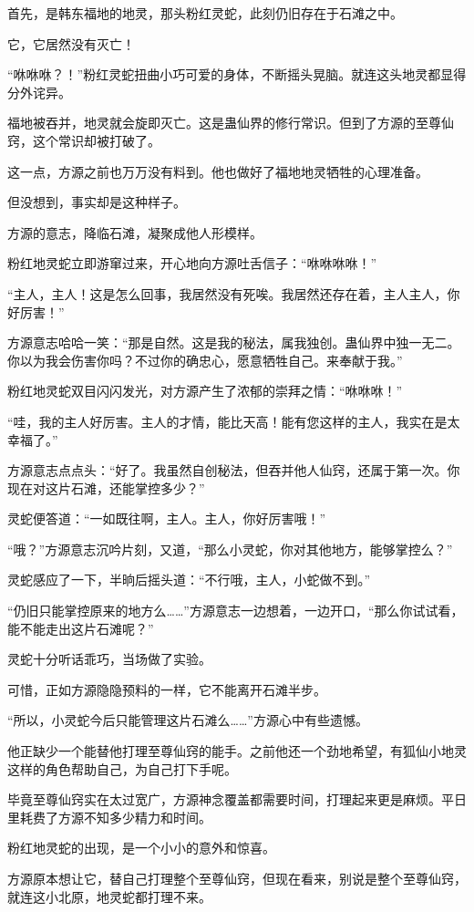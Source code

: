 \begin{this_body}
首先，是韩东福地的地灵，那头粉红灵蛇，此刻仍旧存在于石滩之中。

它，它居然没有灭亡！

“咻咻咻？！”粉红灵蛇扭曲小巧可爱的身体，不断摇头晃脑。就连这头地灵都显得分外诧异。

福地被吞并，地灵就会旋即灭亡。这是蛊仙界的修行常识。但到了方源的至尊仙窍，这个常识却被打破了。

这一点，方源之前也万万没有料到。他也做好了福地地灵牺牲的心理准备。

但没想到，事实却是这种样子。

方源的意志，降临石滩，凝聚成他人形模样。

粉红地灵蛇立即游窜过来，开心地向方源吐舌信子：“咻咻咻咻！”

“主人，主人！这是怎么回事，我居然没有死唉。我居然还存在着，主人主人，你好厉害！”

方源意志哈哈一笑：“那是自然。这是我的秘法，属我独创。蛊仙界中独一无二。你以为我会伤害你吗？不过你的确忠心，愿意牺牲自己。来奉献于我。”

粉红地灵蛇双目闪闪发光，对方源产生了浓郁的崇拜之情：“咻咻咻！”

“哇，我的主人好厉害。主人的才情，能比天高！能有您这样的主人，我实在是太幸福了。”

方源意志点点头：“好了。我虽然自创秘法，但吞并他人仙窍，还属于第一次。你现在对这片石滩，还能掌控多少？”

灵蛇便答道：“一如既往啊，主人。主人，你好厉害哦！”

“哦？”方源意志沉吟片刻，又道，“那么小灵蛇，你对其他地方，能够掌控么？”

灵蛇感应了一下，半晌后摇头道：“不行哦，主人，小蛇做不到。”

“仍旧只能掌控原来的地方么……”方源意志一边想着，一边开口，“那么你试试看，能不能走出这片石滩呢？”

灵蛇十分听话乖巧，当场做了实验。

可惜，正如方源隐隐预料的一样，它不能离开石滩半步。

“所以，小灵蛇今后只能管理这片石滩么……”方源心中有些遗憾。

他正缺少一个能替他打理至尊仙窍的能手。之前他还一个劲地希望，有狐仙小地灵这样的角色帮助自己，为自己打下手呢。

毕竟至尊仙窍实在太过宽广，方源神念覆盖都需要时间，打理起来更是麻烦。平日里耗费了方源不知多少精力和时间。

粉红地灵蛇的出现，是一个小小的意外和惊喜。

方源原本想让它，替自己打理整个至尊仙窍，但现在看来，别说是整个至尊仙窍，就连这小北原，地灵蛇都打理不来。


\end{this_body}
